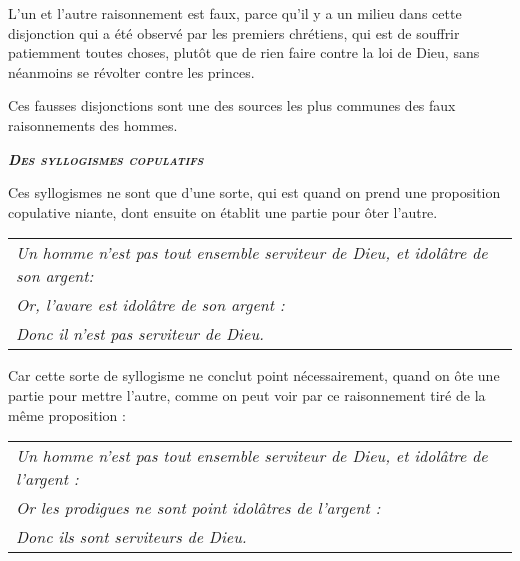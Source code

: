L'un et l'autre raisonnement est faux, parce qu'il y a un milieu dans cette disjonction qui a été observé par les premiers chrétiens, qui est de souffrir patiemment toutes choses, plutôt que de rien faire contre la loi de Dieu, sans néanmoins se révolter contre les princes.

Ces fausses disjonctions sont une des sources les plus communes des faux raisonnements des hommes.

\begin{center}\emph{\scshape\bfseries Des syllogismes copulatifs}\end{center}

Ces syllogismes ne sont que d'une sorte, qui est quand on prend une proposition copulative niante, dont ensuite on établit une partie pour ôter l'autre.

	\begin{tabularx}{\textwidth}{X}
		\emph{Un homme n'est pas tout ensemble serviteur de Dieu, et idolâtre de son argent:} \\
		\emph{Or, l'avare est idolâtre de son argent :} \\
		\emph{Donc il n'est pas serviteur de Dieu.} \\
	\end{tabularx}

Car cette sorte de syllogisme ne conclut point nécessairement, quand on ôte une partie pour mettre l'autre, comme on peut voir par ce raisonnement tiré de la même proposition :

	\begin{tabularx}{\textwidth}{X}
		\emph{Un homme n'est pas tout ensemble serviteur de Dieu, et idolâtre de l'argent :} \\
		\emph{Or les prodigues ne sont point idolâtres de l'argent :} \\
		\emph{Donc ils sont serviteurs de Dieu.} \\
	\end{tabularx}


